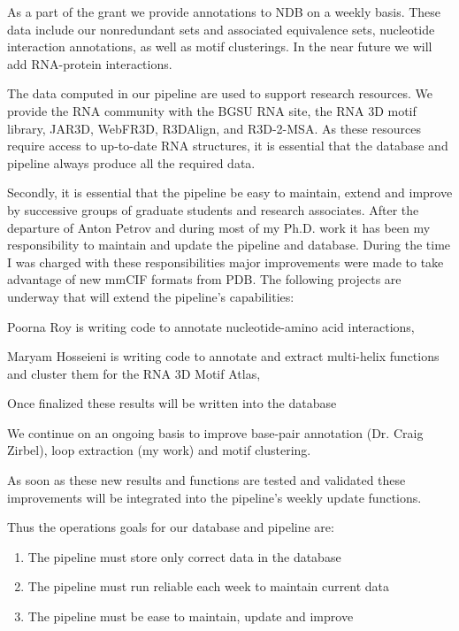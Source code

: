 As a part of the grant we provide annotations to NDB on a weekly basis. These
data include our nonredundant sets and associated equivalence sets, nucleotide
interaction annotations, as well as motif clusterings. In the near future we
will add RNA-protein interactions.

The data computed in our pipeline are used to support research resources. We
provide the RNA community with the BGSU RNA site, the RNA 3D motif library,
JAR3D, WebFR3D, R3DAlign, and R3D-2-MSA\@. As these resources require access to
up-to-date RNA structures, it is essential that the database and pipeline always
produce all the required data.

Secondly, it is essential that the pipeline be easy to maintain, extend and
improve by successive groups of graduate students and research associates. After
the departure of Anton Petrov and during most of my Ph.D. work it has been my
responsibility to maintain and update the pipeline and database. During the time
I was charged with these responsibilities major improvements were made to take
advantage of new mmCIF formats from PDB\@. The following projects are underway
that will extend the pipeline's capabilities: 
\begin{enumerate*}
        \item Poorna Roy is writing code to annotate nucleotide-amino acid
                interactions, 
        \item Maryam Hosseieni is writing code to annotate and extract
                multi-helix functions and cluster them for the RNA 3D Motif
                Atlas, 
        \item Once finalized these results will be written into the database 
        \item We continue on an ongoing basis to improve base-pair annotation
                (Dr. Craig Zirbel), loop extraction (my work) and motif
                clustering.
\end{enumerate*} 
As soon as these new results and functions are tested and validated these
improvements will be integrated into the pipeline's weekly update functions.

Thus the operations goals for our database and pipeline are:
\begin{enumerate}
        \item The pipeline must store only correct data in the database
        \item The pipeline must run reliable each week to maintain current data
        \item The pipeline must be ease to maintain, update and improve
\end{enumerate}

